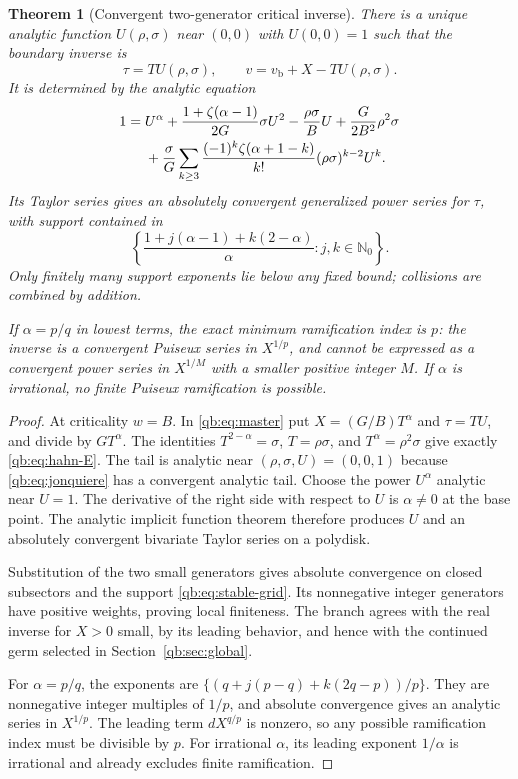 \documentclass[11pt,a4paper]{article}
\newtheorem{theorem}{Theorem}[section]
\theoremstyle{definition}\newtheorem{definition}[theorem]{Definition}
\theoremstyle{remark}\newtheorem{remark}[theorem]{Remark}
\newcommand{\N}{\mathbb N}
\newcommand{\vb}{v_{\mathrm b}}
\numberwithin{equation}{section}
\begin{document}
\begin{theorem}[Convergent two-generator critical inverse]
\label{qb:thm:hahn}
There is a unique analytic function $U(\rho,\sigma)$ near $(0,0)$ with
$U(0,0)=1$ such that the boundary inverse is
\begin{equation}\label{qb:eq:hahn-inverse}
 \tau=T U(\rho,\sigma),\qquad v=\vb+X-TU(\rho,\sigma).
\end{equation}
It is determined by the analytic equation
\begin{align}\label{qb:eq:hahn-E}
 1={}&U^\alpha+\frac{1+\zeta(\alpha-1)}{2G}\sigma U^2
 -\frac{\rho\sigma}{B}U+\frac{G}{2B^2}\rho^2\sigma\notag\\
 &+\frac{\sigma}{G}\sum_{k\ge3}
 \frac{(-1)^k\zeta(\alpha+1-k)}{k!}
 (\rho\sigma)^{k-2}U^k.
\end{align}
Its Taylor series gives an absolutely convergent generalized power series
for $\tau$, with support contained in
\begin{equation}\label{qb:eq:stable-grid}
 \left\{\frac{1+j(\alpha-1)+k(2-\alpha)}{\alpha}:
                  j,k\in\N_0\right\}.
\end{equation}
Only finitely many support exponents lie below any fixed bound; collisions
are combined by addition.

If $\alpha=p/q$ in lowest terms, the exact minimum ramification index is
$p$: the inverse is a convergent Puiseux series in $X^{1/p}$, and cannot
be expressed as a convergent power series in $X^{1/M}$ with a smaller
positive integer $M$. If $\alpha$ is irrational, no finite Puiseux
ramification is possible.
\end{theorem}
\begin{proof}
At criticality $w=B$. In \eqref{qb:eq:master} put
$X=(G/B)T^\alpha$ and $\tau=TU$, and divide by $GT^\alpha$.
The identities
$T^{2-\alpha}=\sigma$, $T=\rho\sigma$, and
$T^\alpha=\rho^2\sigma$ give exactly \eqref{qb:eq:hahn-E}.
The tail is analytic near $(\rho,\sigma,U)=(0,0,1)$ because
\eqref{qb:eq:jonquiere} has a convergent analytic tail. Choose the power
$U^\alpha$ analytic near $U=1$. The derivative of the right side with
respect to $U$ is $\alpha\ne0$ at the base point. The analytic implicit
function theorem therefore produces $U$ and an absolutely convergent
bivariate Taylor series on a polydisk.

Substitution of the two small generators gives absolute convergence on
closed subsectors and the support \eqref{qb:eq:stable-grid}. Its
nonnegative integer generators have positive weights, proving local
finiteness. The branch agrees with the real inverse for $X>0$ small,
by its leading behavior, and hence with the continued germ selected in
Section~\ref{qb:sec:global}.

For $\alpha=p/q$, the exponents are
$\{(q+j(p-q)+k(2q-p))/p\}$. They are nonnegative integer multiples
of $1/p$, and absolute convergence gives an analytic series in $X^{1/p}$.
The leading term $dX^{q/p}$ is nonzero, so any possible ramification
index must be divisible by $p$. For irrational $\alpha$, its leading
exponent $1/\alpha$ is irrational and already excludes finite
ramification.
\end{proof}
\end{document}
